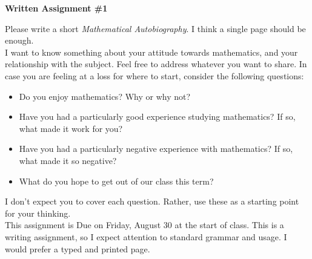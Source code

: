 \documentclass[12pt,letterpaper]{article}
\begin{document}
\setlength{\parskip}{1ex plus 0.5ex minus 0.2ex}
\setlength{\parindent}{0pt}

\pagestyle{fancy}
\lfoot{} 
\rfoot{} 

\begin{center}
{
\Large
\textbf{Written Assignment \#1}
}
\end{center}

Please write a short \emph{Mathematical Autobiography}.
I think a single page should be enough.\\

I want to know something about your attitude towards mathematics, and your relationship with the subject.
Feel free to address whatever you want to share.
In case you are feeling at a loss for where to start, consider the following questions:
\begin{itemize}
\item Do you enjoy mathematics? Why or why not?
\item Have you had a particularly good experience studying mathematics?
If so, what made it work for you?
\item Have you had a particularly negative experience with mathematics?
If so, what made it so negative?
\item What do you hope to get out of our class this term?
\end{itemize}
I don't expect you to cover each question. Rather, use these as a starting point for your thinking.\\[.5in]


This assignment is Due on Friday, August 30 at the start of class.
This is a writing assignment, so I expect attention to standard grammar and usage.
I would prefer a typed and printed page.
\end{document}
